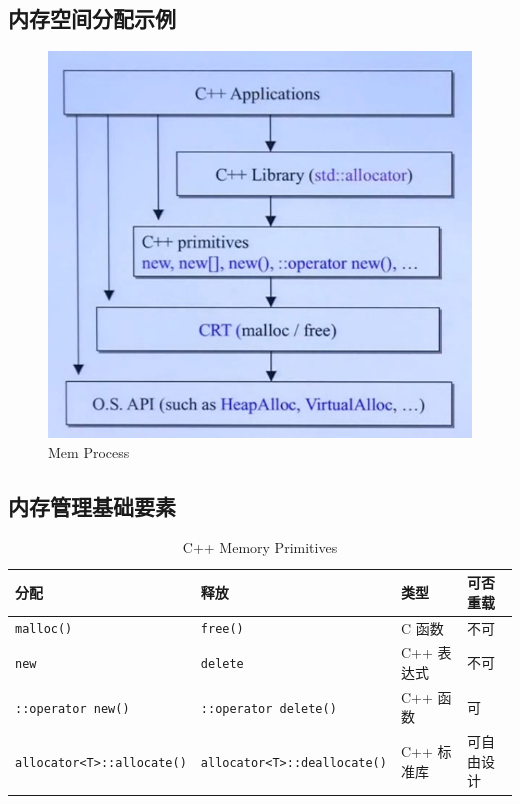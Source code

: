 \documentclass[UTF8,a4paper,12pt]{ctexbook}
\begin{document}
		\subsection{内存空间分配示例}
			\begin{figure}[H]
				\centering
				\includegraphics[scale = 0.5]{MemProcess.png}
				\caption{Mem Process}
			\end{figure}

		
		\subsection{内存管理基础要素}
			\begin{table}[H]
				\caption{C++ Memory Primitives}
				\begin{tabular}{llll}
					\toprule[1.5pt]
					分配& 释放& 类型& 可否重载\\
					\midrule[1pt]
					\verb|malloc()|&\verb|free()|& C 函数& 不可\\
					\verb|new|&		\verb|delete|& C++ 表达式& 不可\\
					\verb|::operator new()|& \verb|::operator delete()|& C++ 函数& 可\\
					\verb|allocator<T>::allocate()|& \verb|allocator<T>::deallocate()|& C++ 标准库& 可自由设计\\
					\bottomrule[1.5pt]
				\end{tabular}
			\end{table}	
			
\end{document}
